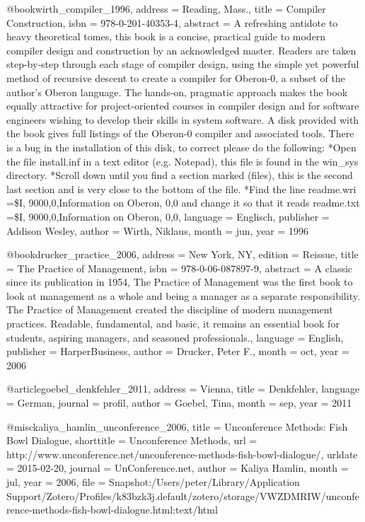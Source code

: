 {@book{wirth_compiler_1996,
  address   = {Reading, Mass.},
  title     = {Compiler {Construction}},
  isbn      = {978-0-201-40353-4},
  abstract  = {A refreshing antidote to heavy theoretical tomes, this book is a concise, practical guide to modern compiler design and construction by an acknowledged master. Readers are taken step-by-step through each stage of compiler design, using the simple yet powerful method of recursive descent to create a compiler for Oberon-0, a subset of the author's Oberon language.  The hands-on, pragmatic approach makes the book equally attractive for project-oriented courses in compiler design and for software engineers wishing to develop their skills in system software.  A disk provided with the book gives full listings of the Oberon-0 compiler and associated tools.  There is a bug in the installation of this disk, to correct please do the following: *Open the file install.inf in a text editor (e.g. Notepad), this file is found in the win\_sys directory.  *Scroll down until you find a section marked (files), this is the second last section and is very close to the bottom of the file.  *Find the line readme.wri =\$I, 9000,0,Information on Oberon, 0,0 and change it so that it reads readme.txt =\$I, 9000,0,Information on Oberon, 0,0},
  language  = {Englisch},
  publisher = {Addison Wesley},
  author    = {Wirth, Niklaus},
  month     = jun,
  year      = {1996}
}

@book{drucker_practice_2006,
  address   = {New York, NY},
  edition   = {Reissue},
  title     = {The {Practice} of {Management}},
  isbn      = {978-0-06-087897-9},
  abstract  = {A classic since its publication in 1954, The Practice of Management was the first book to look at management as a whole and being a manager as a separate responsibility. The Practice of Management created the discipline of modern management practices. Readable, fundamental, and basic, it remains an essential book for students, aspiring managers, and seasoned professionals.},
  language  = {English},
  publisher = {HarperBusiness},
  author    = {Drucker, Peter F.},
  month     = oct,
  year      = {2006}
}

@article{goebel_denkfehler_2011,
  address  = {Vienna},
  title    = {Denkfehler},
  language = {German},
  journal  = {profil},
  author   = {Goebel, Tina},
  month    = sep,
  year     = {2011}
}

@misc{kaliya_hamlin_unconference_2006,
  title      = {Unconference {Methods}: {Fish} {Bowl} {Dialogue}},
  shorttitle = {Unconference {Methods}},
  url        = {http://www.unconference.net/unconference-methods-fish-bowl-dialogue/},
  urldate    = {2015-02-20},
  journal    = {UnConference.net},
  author     = {{Kaliya Hamlin}},
  month      = jul,
  year       = {2006},
  file       = {Snapshot:/Users/peter/Library/Application Support/Zotero/Profiles/k83bzk3j.default/zotero/storage/VWZDMRIW/unconference-methods-fish-bowl-dialogue.html:text/html}
}

}
